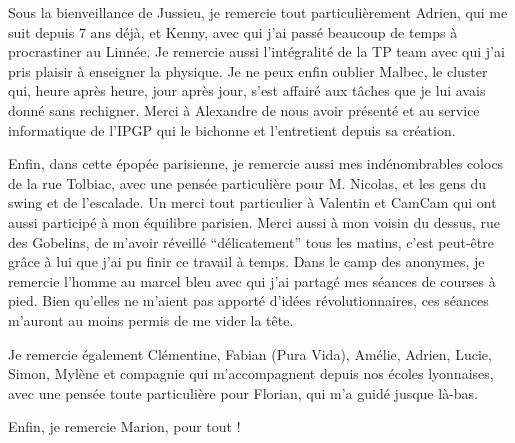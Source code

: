 Sous   la  bienveillance   de   Jussieu,  je   remercie    tout
particulièrement Adrien,  qui me suit  depuis $7$ ans déjà,  et Kenny,
avec qui  j’ai passé beaucoup de  temps à procrastiner au  Linnée.  Je
remercie aussi l'intégralité de la TP  team avec qui j'ai pris plaisir
à enseigner la physique.  Je ne  peux enfin oublier Malbec, le cluster
qui, heure après heure, jour après jour, s’est affairé aux tâches que je
lui  avais donné  sans rechigner.   Merci  à Alexandre  de nous  avoir
présenté  et au  service informatique  de  l’IPGP qui  le bichonne  et
l’entretient depuis sa création.

Enfin,   dans  cette   épopée  parisienne,   je  remercie   aussi  mes
indénombrables colocs de la rue  Tolbiac, avec une pensée particulière
pour M.   Nicolas, et les  gens du swing  et de l’escalade.   Un merci
tout particulier  à Valentin et CamCam  qui ont aussi participé  à mon
équilibre  parisien. Merci  aussi  à  mon voisin  du  dessus, rue  des
Gobelins, de m’avoir réveillé  ``délicatement'' tous les matins, c’est
peut-être grâce à  lui que j’ai pu  finir ce travail à  temps. Dans le
camp des  anonymes, je remercie l’homme  au marcel bleu avec  qui j’ai
partagé mes  séances de courses à  pied. Bien qu’elles ne  m’aient pas
apporté d’idées révolutionnaires, ces séances m’auront au moins permis
de me vider la tête.

Je remercie également Clémentine,  Fabian (Pura Vida), Amélie, Adrien,
Lucie, Simon, Mylène et compagnie qui m’accompagnent depuis nos écoles
lyonnaises, avec une  pensée toute particulière pour  Florian, qui m’a
guidé jusque là-bas.

Enfin, je remercie Marion, pour tout !











\vspace{2cm}

